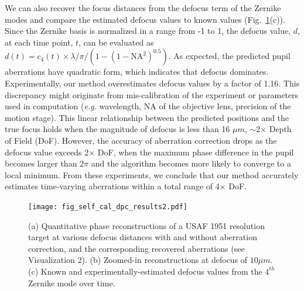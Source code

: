 We can also recover the focus distances from the defocus term of the Zernike modes and compare the estimated defocus values to known values (Fig.~\ref{fig:self_cal_dpc_experimentalresults2}(c)). Since the Zernike basis is normalized in a range from -1 to 1, the defocus value, $d$, at each time point, $t$, can be evaluated as $d(t) = c_{4}(t)\times\lambda/\pi/(1 - (1 - \mathrm{NA}^{2})^{0.5})$. As expected, the predicted pupil aberrations have quadratic form, which indicates that defocus dominates. Experimentally, our method overestimates defocus values by a factor of 1.16. This discrepancy might originate from mis-calibration of the experiment or parameters used in computation (\textit{e.g.} wavelength, $\mathrm{NA}$ of the objective lens, precision of the motion stage). This linear relationship between the predicted positions and the true focus holds when the magnitude of defocus is less than 16 $\mu m$, $\sim$2$\times$ Depth of Field (DoF). However, the accuracy of aberration correction drops as the defocus value exceeds 2$\times$ DoF, when the maximum phase difference in the pupil becomes larger than 2$\pi$ and the algorithm becomes more likely to converge to a local minimum. From these experiments, we conclude that our method accurately estimates time-varying aberrations within a total range of 4$\times$ DoF.

\begin{figure}[ht!]
\centering\texttt{[image: fig\_self\_cal\_dpc\_results2.pdf]}
\caption{\label{fig:self_cal_dpc_experimentalresults2} (a) Quantitative phase reconstructions of a USAF 1951 resolution target at various defocus distances with and without aberration correction, and the corresponding recovered aberrations (see Visualization 2). (b) Zoomed-in reconstructions at defocus of $10 \mu m$. (c) Known and experimentally-estimated defocus values from the $4^{th}$ Zernike mode over time.}
\end{figure}

